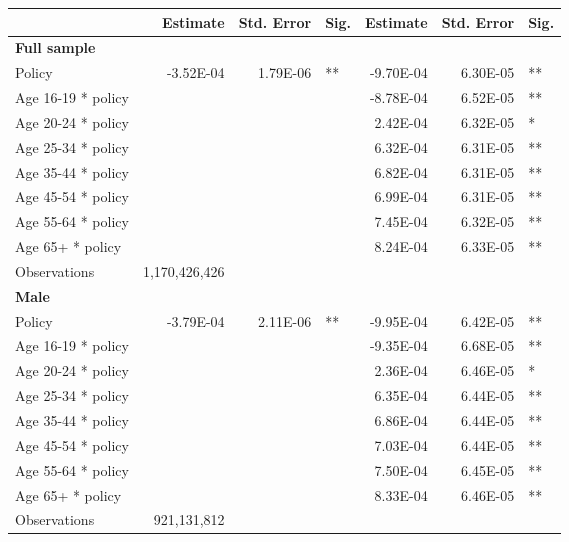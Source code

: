 
\begin{table}%
\centering 
\begin{tabular}{l r r l r r l} 

\hline 
 
 & Estimate & Std. Error & Sig. & Estimate & Std. Error & Sig. \\ 

\hline 
 
\textbf{Full sample} \\ 

Policy             &  -3.52E-04        &  1.79E-06       &   **       &  -9.70E-04        &  6.30E-05       &   **       \\ 
Age 16-19 * policy           & & &  &  -8.78E-04        &  6.52E-05       &   **       \\ 
Age 20-24 * policy           & & &  &  2.42E-04        &  6.32E-05       &    *       \\ 
Age 25-34 * policy           & & &  &  6.32E-04        &  6.31E-05       &   **       \\ 
Age 35-44 * policy           & & &  &  6.82E-04        &  6.31E-05       &   **       \\ 
Age 45-54 * policy           & & &  &  6.99E-04        &  6.31E-05       &   **       \\ 
Age 55-64 * policy           & & &  &  7.45E-04        &  6.32E-05       &   **       \\ 
Age 65+ * policy           & & &  &  8.24E-04        &  6.33E-05       &   **       \\ 
Observations & 1,170,426,426 \\ 


\hline 

\textbf{Male} \\ 

Policy             &  -3.79E-04        &  2.11E-06       &   **       &  -9.95E-04        &  6.42E-05       &   **       \\ 
Age 16-19 * policy           & & &  &  -9.35E-04        &  6.68E-05       &   **       \\ 
Age 20-24 * policy           & & &  &  2.36E-04        &  6.46E-05       &    *       \\ 
Age 25-34 * policy           & & &  &  6.35E-04        &  6.44E-05       &   **       \\ 
Age 35-44 * policy           & & &  &  6.86E-04        &  6.44E-05       &   **       \\ 
Age 45-54 * policy           & & &  &  7.03E-04        &  6.44E-05       &   **       \\ 
Age 55-64 * policy           & & &  &  7.50E-04        &  6.45E-05       &   **       \\ 
Age 65+ * policy           & & &  &  8.33E-04        &  6.46E-05       &   **       \\ 
Observations & 921,131,812 \\ 



\end{tabular}
\end{table}
